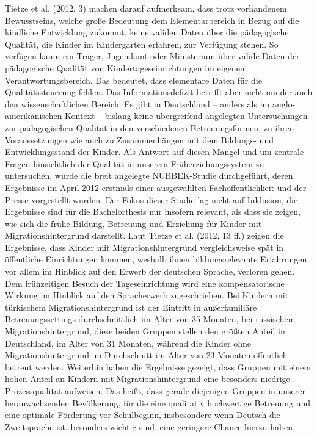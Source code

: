 Tietze et al. (2012, 3) machen darauf aufmerksam, dass trotz vorhandenem Bewusstseins, welche große Bedeutung dem Elementarbereich in Bezug auf die kindliche Entwicklung zukommt, keine validen Daten über die pädagogische Qualität, die Kinder im Kindergarten erfahren, zur Verfügung stehen.
So verfügen kaum ein Träger, Jugendamt oder Ministerium über valide Daten der pädagogische Qualität von Kindertageseinrichtungen im eigenen Verantwortungsbereich. Das bedeutet, dass elementare Daten für die Qualitätssteuerung fehlen.
Das Informationsdefizit betrifft aber nicht minder auch den wissenschaftlichen Bereich. Es gibt in Deutschland – anders als im anglo-amerikanischen Kontext – bislang keine übergreifend angelegten Untersuchungen zur pädagogischen Qualität in den verschiedenen Betreuungsformen, zu ihren Voraussetzungen wie auch zu Zusammenhängen mit dem Bildungs- und Entwicklungsstand der Kinder. Als Antwort auf diesen Mangel und um zentrale Fragen
hinsichtlich der Qualität in unserem Früherziehungssystem zu
untersuchen, wurde die breit angelegte NUBBEK-Studie durchgeführt, deren Ergebnisse im April 2012 erstmals einer ausgewählten Fachöffentlichkeit und der Presse vorgestellt wurden. 
Der Fokus dieser Studie lag nicht auf Inklusion, die Ergebnisse sind für die Bachelorthesis nur insofern relevant, als dass sie zeigen, wie sich die frühe Bildung, Betreuung und Erziehung für Kinder mit Migrationshintergrund darstellt. 
Laut Tietze et al. (2012, 13 ff.) zeigen die Ergebnisse, dass Kinder mit Migrationshintergrund vergleichsweise spät in öffentliche Einrichtungen  kommen, weshalb ihnen bildungsrelevante Erfahrungen, vor allem im Hinblick auf den Erwerb der deutschen Sprache, verloren gehen. Dem frühzeitigen Besuch der Tageseinrichtung wird eine kompensatorische Wirkung im Hinblick auf den Spracherwerb zugeschrieben. Bei Kindern mit türkischem Migrationshintergrund ist der Eintritt in außerfamiliäre Betreuungssettings durchschnittlich im Alter von 35 Monaten, bei russischem Migrationshintergrund, diese beiden Gruppen stellen den größten Anteil in Deutschland, im Alter von 31 Monaten, während die Kinder ohne Migrationshintergrund im Durchschnitt im Alter von 23 Monaten öffentlich betreut werden. Weiterhin haben die Ergebnisse gezeigt, dass Gruppen mit einem hohen Anteil an Kindern mit Migrationshintergrund eine besonders niedrige Prozessqualität aufweisen. Das heißt, dass gerade diejenigen Gruppen in unserer heranwachsenden Bevölkerung, für die eine qualitativ hochwertige Betreuung und eine optimale Förderung vor Schulbeginn, insbesondere wenn Deutsch die Zweitsprache ist, besonders wichtig sind, eine geringere Chance hierzu haben.
